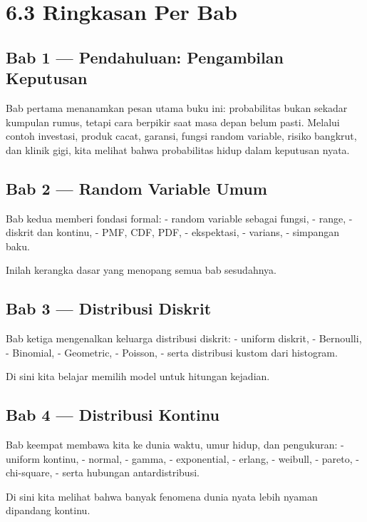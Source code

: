 \documentclass[
  letterpaper,
  DIV=11,
  numbers=noendperiod]{scrreprt}
\begin{document}
\section{6.3 Ringkasan Per Bab}\label{ringkasan-per-bab}

\subsection{Bab 1 --- Pendahuluan: Pengambilan
Keputusan}\label{bab-1-pendahuluan-pengambilan-keputusan}

Bab pertama menanamkan pesan utama buku ini: probabilitas bukan sekadar
kumpulan rumus, tetapi cara berpikir saat masa depan belum pasti.
Melalui contoh investasi, produk cacat, garansi, fungsi random variable,
risiko bangkrut, dan klinik gigi, kita melihat bahwa probabilitas hidup
dalam keputusan nyata.

\subsection{Bab 2 --- Random Variable
Umum}\label{bab-2-random-variable-umum}

Bab kedua memberi fondasi formal: - random variable sebagai fungsi, -
range, - diskrit dan kontinu, - PMF, CDF, PDF, - ekspektasi, - varians,
- simpangan baku.

Inilah kerangka dasar yang menopang semua bab sesudahnya.

\subsection{Bab 3 --- Distribusi
Diskrit}\label{bab-3-distribusi-diskrit}

Bab ketiga mengenalkan keluarga distribusi diskrit: - uniform diskrit, -
Bernoulli, - Binomial, - Geometric, - Poisson, - serta distribusi kustom
dari histogram.

Di sini kita belajar memilih model untuk hitungan kejadian.

\subsection{Bab 4 --- Distribusi
Kontinu}\label{bab-4-distribusi-kontinu}

Bab keempat membawa kita ke dunia waktu, umur hidup, dan pengukuran: -
uniform kontinu, - normal, - gamma, - exponential, - erlang, - weibull,
- pareto, - chi-square, - serta hubungan antardistribusi.

Di sini kita melihat bahwa banyak fenomena dunia nyata lebih nyaman
dipandang kontinu.
\end{document}

